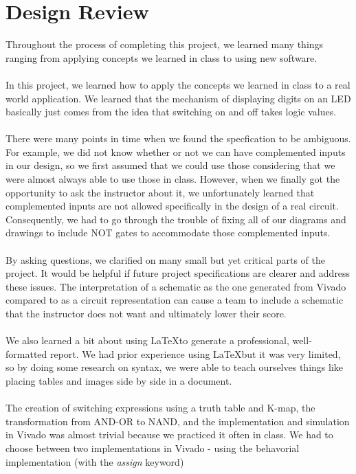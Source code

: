 \documentclass{article}
\begin{document}
\section{Design Review}
Throughout the process of completing this project, we learned many things 
ranging from applying concepts we learned in class to using new software.\\
\\
In this project, we learned how to apply the concepts we learned in class to a 
real world application. We learned that the mechanism of displaying digits on 
an LED basically just comes from the idea that switching on and off takes
logic values.  \\
\\
There were many points in time when we found the specfication to be ambiguous. 
For example, we did not know whether or not we can have complemented inputs
in our design, so we first assumed that we could use those considering that we 
were almost always able to use those in class. However, when we finally got 
the opportunity to ask the instructor about it, we unfortunately learned that 
complemented inputs are not allowed specifically in the design of a real 
circuit. Consequently, we had to go through the trouble of fixing all of our 
diagrams and drawings to include NOT gates to accommodate those complemented 
inputs.\\
\\
By asking questions, we clarified on many small but yet critical parts of the 
project. It would be helpful if future project specifications are clearer and 
address these issues. The interpretation of a schematic as the one generated 
from Vivado compared to as a circuit representation can cause a team to include
 a schematic that the instructor does not want and ultimately lower their 
score.\\
\\
We also learned a bit about using \LaTeX to generate a professional, 
well-formatted report. We had prior experience using \LaTeX but it was very 
limited, so by doing some research on syntax, we were able to teach ourselves 
things like placing tables and images side by side in a document.\\
\\
The creation of switching expressions using a truth 
table and K-map, the transformation from AND-OR to NAND, and the 
implementation and simulation in Vivado was almost trivial because we 
practiced it often in class. We had to choose between two implementations in 
Vivado - using the behavorial implementation (with the \textit{assign} keyword) 
\end{document}
